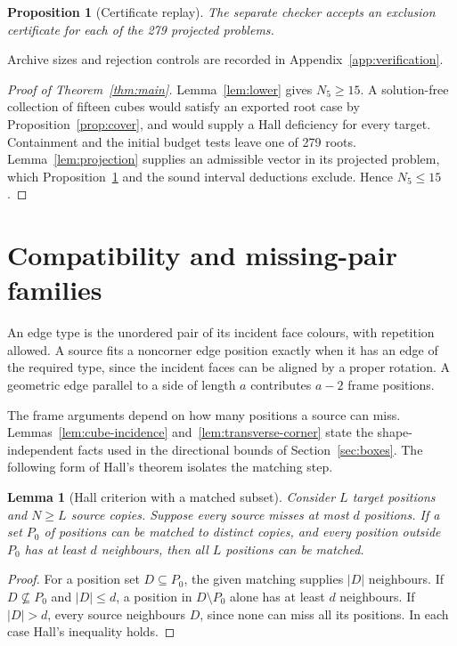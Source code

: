 \documentclass[11pt]{article}
\newtheorem{lemma}[theorem]{Lemma}
\newtheorem{proposition}[theorem]{Proposition}
\theoremstyle{remark}
\begin{document}
\begin{proposition}[Certificate replay]\label{prop:replay}
The separate checker accepts an exclusion certificate for each of the
279 projected problems.
\end{proposition}
Archive sizes and rejection controls are recorded in
Appendix~\ref{app:verification}.

\begin{proof}[Proof of Theorem~\ref{thm:main}]
Lemma~\ref{lem:lower} gives $N_5\ge15$. A solution-free collection of fifteen
cubes would satisfy an exported root case by Proposition~\ref{prop:cover},
and would supply a Hall deficiency for every target. Containment and the initial
budget tests leave one of 279 roots. Lemma~\ref{lem:projection} supplies an
admissible vector in its projected problem, which Proposition~\ref{prop:replay}
and the sound interval deductions exclude. Hence $N_5\le15$.
\end{proof}

\section{Compatibility and missing-pair families}\label{sec:frames}
An edge type is the unordered pair of its incident face colours, with
repetition allowed. A source fits a noncorner edge position exactly when it
has an edge of the required type, since the incident faces can be aligned
by a proper rotation. A geometric edge parallel to a side of length $a$
contributes $a-2$ frame positions.

The frame arguments depend on how many positions a source can miss.
Lemmas~\ref{lem:cube-incidence} and~\ref{lem:transverse-corner} state the
shape-independent facts used in the directional bounds of
Section~\ref{sec:boxes}.
The following form of Hall's theorem isolates the matching step.

\begin{lemma}[Hall criterion with a matched subset]\label{lem:partial-matching}
Consider $L$ target positions and $N\ge L$ source copies. Suppose every
source misses at most $d$ positions. If a set $P_0$ of positions can be
matched to distinct copies, and every position outside $P_0$ has at least
$d$ neighbours, then all $L$ positions can be matched.
\end{lemma}
\begin{proof}
For a position set $D\subseteq P_0$, the given matching supplies $|D|$
neighbours. If $D\nsubseteq P_0$ and $|D|\le d$, a position in
$D\setminus P_0$ alone has at least $d$ neighbours. If $|D|>d$, every
source neighbours $D$, since none can miss all its positions. In each case
Hall's inequality holds.
\end{proof}
\end{document}

